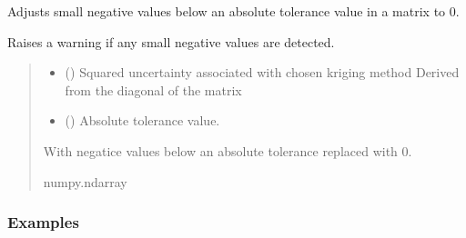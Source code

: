 \documentclass[letterpaper,10pt,english]{sphinxmanual}
\begin{document}

\begin{fulllineitems}
\label{\detokenize{misc:glomar_gridding.utils.adjust_small_negative}}
\pysigstartsignatures
\pysiglinewithargsret
{}
{\sphinxparamcomma {}}
{}
\pysigstopsignatures
\sphinxAtStartPar
Adjusts small negative values below an absolute tolerance value in a matrix
to 0.

\sphinxAtStartPar
Raises a warning if any small negative values are detected.
\begin{quote}\begin{description}
\begin{itemize}
\item {}
\sphinxAtStartPar
{} (\sphinxstyleliteralemphasis{\sphinxupquote{{[}}}\sphinxstyleliteralemphasis{\sphinxupquote{{]}}}) \textendash{} Squared uncertainty associated with chosen kriging method
Derived from the diagonal of the matrix

\item {}
\sphinxAtStartPar
{} (\sphinxstyleliteralemphasis{\sphinxupquote{, }}) \textendash{} Absolute tolerance value.

\end{itemize}

\sphinxAtStartPar
With negatice values below an absolute tolerance replaced with 0.

\sphinxAtStartPar
numpy.ndarray

\end{description}\end{quote}
\subsubsection*{Examples}


\end{fulllineitems}
\end{document}
